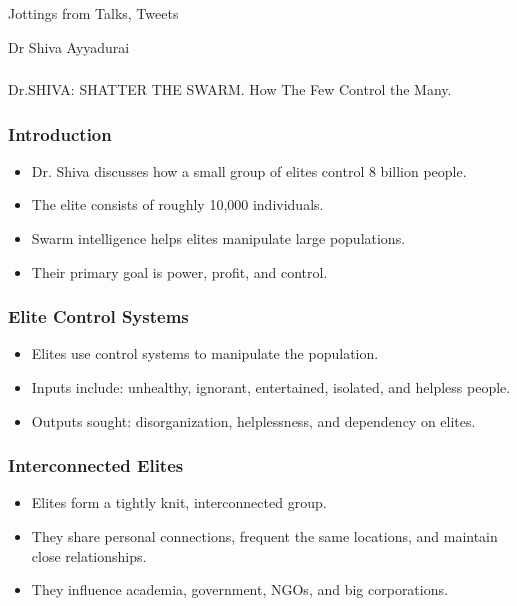\begin{frame}[fragile]\frametitle{}
\begin{center}
{\Large Jottings from Talks, Tweets}

{\small Dr Shiva Ayyadurai}


\end{center}
\end{frame}

\begin{frame}[fragile]\frametitle{}
\begin{center}
{\Large Dr.SHIVA: SHATTER THE SWARM. How The Few Control the Many.}
\end{center}
\end{frame}


\begin{frame}[fragile]\frametitle{Introduction}
    \begin{itemize}
        \item Dr. Shiva discusses how a small group of elites control 8 billion people.
        \item The elite consists of roughly 10,000 individuals.
        \item Swarm intelligence helps elites manipulate large populations.
        \item Their primary goal is power, profit, and control.
    \end{itemize}
\end{frame}

\begin{frame}[fragile]\frametitle{Elite Control Systems}
    \begin{itemize}
        \item Elites use control systems to manipulate the population.
        \item Inputs include: unhealthy, ignorant, entertained, isolated, and helpless people.
        \item Outputs sought: disorganization, helplessness, and dependency on elites.
    \end{itemize}
\end{frame}

\begin{frame}[fragile]\frametitle{Interconnected Elites}
    \begin{itemize}
        \item Elites form a tightly knit, interconnected group.
        \item They share personal connections, frequent the same locations, and maintain close relationships.
        \item They influence academia, government, NGOs, and big corporations.
    \end{itemize}
\end{frame}

